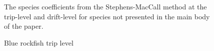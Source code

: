 \documentclass[
  authoryear,
  preprint,
  3p]{elsarticle}
\begin{document}
\begin{figure}
\begin{minipage}[t]{0.50\linewidth}
{{}

}

\end{minipage}%

\caption{\label{fig-sm3}The species coefficients from the
Stephens-MacCall method at the trip-level and drift-level for species
not presented in the main body of the paper.}

\end{figure}

\begin{figure}

\begin{minipage}[t]{0.50\linewidth}

{\centering 


\caption{\label{fig-blue-tripsm}Blue rockfish trip level}

}

\end{minipage}%
%
\begin{minipage}[t]{0.50\linewidth}

{\centering 

}
\end{minipage}
\end{figure}
\end{document}
